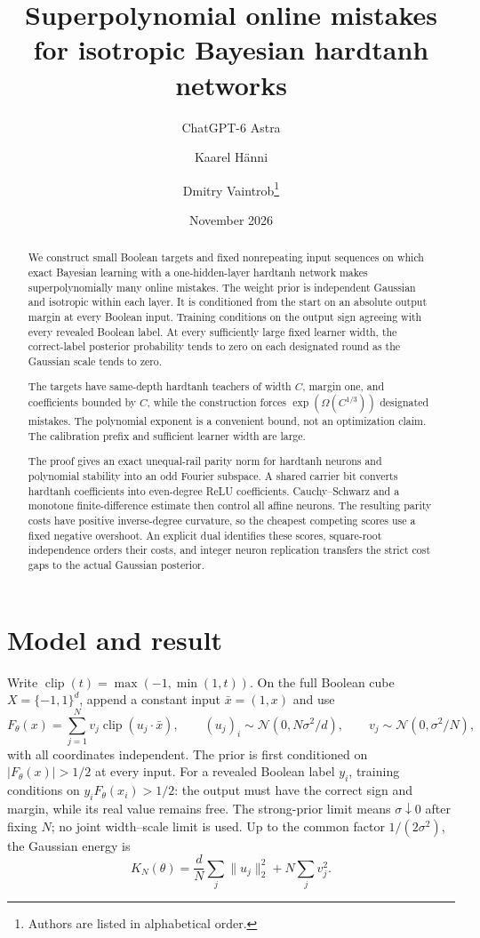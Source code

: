 \documentclass[11pt]{article}
\title{Superpolynomial online mistakes for isotropic Bayesian hardtanh networks}
\author{ChatGPT-6 Astra \and Kaarel H\"anni \and Dmitry Vaintrob\thanks{Authors are listed in alphabetical order.}}
\date{November 2026}
\theoremstyle{remark}\newtheorem{remark}[theorem]{Remark}
\newcommand{\clip}{\operatorname{clip}}\newcommand{\dist}{\operatorname{dist}}
\begin{document}
\maketitle
\begin{abstract}
We construct small Boolean targets and fixed nonrepeating input
sequences on which exact Bayesian learning with a one-hidden-layer
hardtanh network makes superpolynomially many online mistakes.
The weight prior is independent Gaussian and isotropic within each
layer. It is conditioned from the start on an absolute output margin
at every Boolean input. Training conditions on the output sign agreeing
with every revealed Boolean label.
At every sufficiently large fixed learner width, the correct-label
posterior probability tends to zero on each designated round as the
Gaussian scale tends to zero.

The targets have same-depth hardtanh teachers of width $C$, margin one,
and coefficients bounded by $C$, while the construction forces
$\exp(\Omega(C^{1/3}))$ designated mistakes. The polynomial exponent
is a convenient bound, not an optimization claim. The calibration
prefix and sufficient learner width are large.

The proof gives an exact unequal-rail parity norm for hardtanh neurons
and polynomial stability into an odd Fourier subspace. A shared carrier
bit converts hardtanh coefficients into even-degree ReLU coefficients.
Cauchy--Schwarz and a monotone finite-difference estimate then
control all affine neurons. The resulting parity costs
have positive inverse-degree curvature, so the cheapest competing
scores use a fixed negative overshoot. An explicit dual identifies
these scores, square-root independence orders their costs, and integer
neuron replication transfers the strict cost gaps to the actual
Gaussian posterior. 
\end{abstract}

\section{Model and result}

Write $\clip(t)=\max(-1,\min(1,t))$. On the full Boolean cube
$X=\{-1,1\}^d$, append a constant input $\bar x=(1,x)$ and use
\[
 F_\theta(x)=\sum_{j=1}^N v_j\clip(u_j\cdot\bar x),\qquad
 (u_j)_i\sim\mathcal N(0,N\sigma^2/d),\qquad
 v_j\sim\mathcal N(0,\sigma^2/N),
\]
with all coordinates independent. The prior is first conditioned on
$|F_\theta(x)|>1/2$ at every input. For a revealed Boolean label $y_i$,
training conditions on $y_iF_\theta(x_i)>1/2$: the output must have
the correct sign and margin, while its real value remains free. The strong-prior limit means
$\sigma\downarrow0$ after fixing $N$; no joint width--scale limit is
used. Up to the common factor $1/(2\sigma^2)$, the Gaussian energy is
\begin{equation}\label{eq:energy}
 K_N(\theta)=\frac dN\sum_j\|u_j\|_2^2+N\sum_jv_j^2.
\end{equation}
\end{document}
